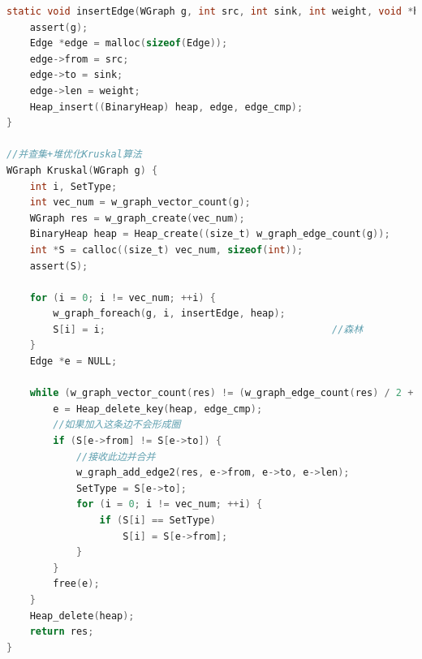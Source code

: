\documentclass[a4paper,10pt]{ctexart}
\begin{document}
\begin{lstlisting}[language={C}]
static void insertEdge(WGraph g, int src, int sink, int weight, void *heap) {
    assert(g);
    Edge *edge = malloc(sizeof(Edge));
    edge->from = src;
    edge->to = sink;
    edge->len = weight;
    Heap_insert((BinaryHeap) heap, edge, edge_cmp);
}

//并查集+堆优化Kruskal算法
WGraph Kruskal(WGraph g) {
    int i, SetType;
    int vec_num = w_graph_vector_count(g);
    WGraph res = w_graph_create(vec_num);
    BinaryHeap heap = Heap_create((size_t) w_graph_edge_count(g));
    int *S = calloc((size_t) vec_num, sizeof(int));
    assert(S);

    for (i = 0; i != vec_num; ++i) {
        w_graph_foreach(g, i, insertEdge, heap);
        S[i] = i;                                       //森林
    }
    Edge *e = NULL;

    while (w_graph_vector_count(res) != (w_graph_edge_count(res) / 2 + 1)) {
        e = Heap_delete_key(heap, edge_cmp);
        //如果加入这条边不会形成圈
        if (S[e->from] != S[e->to]) {
            //接收此边并合并
            w_graph_add_edge2(res, e->from, e->to, e->len);
            SetType = S[e->to];
            for (i = 0; i != vec_num; ++i) {
                if (S[i] == SetType)
                    S[i] = S[e->from];
            }
        }
        free(e);
    }
    Heap_delete(heap);
    return res;
}

\end{lstlisting}
\end{document}
